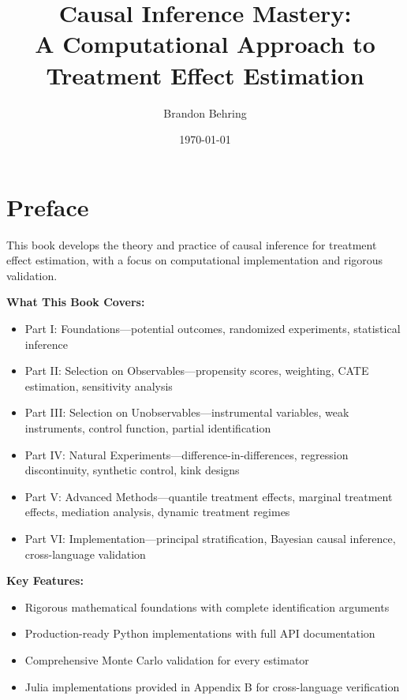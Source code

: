 \documentclass[11pt,oneside]{amsbook}
\title{Causal Inference Mastery:\\
A Computational Approach to Treatment Effect Estimation}
\author{Brandon Behring}
\date{\today}
\theoremstyle{definition}
\theoremstyle{plain}
\theoremstyle{remark}
\begin{document}

\frontmatter

\maketitle

\tableofcontents

\chapter{Preface}

This book develops the theory and practice of causal inference for treatment effect estimation, with a focus on computational implementation and rigorous validation.

\textbf{What This Book Covers:}
\begin{itemize}
    \item Part I: Foundations---potential outcomes, randomized experiments, statistical inference
    \item Part II: Selection on Observables---propensity scores, weighting, CATE estimation, sensitivity analysis
    \item Part III: Selection on Unobservables---instrumental variables, weak instruments, control function, partial identification
    \item Part IV: Natural Experiments---difference-in-differences, regression discontinuity, synthetic control, kink designs
    \item Part V: Advanced Methods---quantile treatment effects, marginal treatment effects, mediation analysis, dynamic treatment regimes
    \item Part VI: Implementation---principal stratification, Bayesian causal inference, cross-language validation
\end{itemize}

\textbf{Key Features:}
\begin{itemize}
    \item Rigorous mathematical foundations with complete identification arguments
    \item Production-ready Python implementations with full API documentation
    \item Comprehensive Monte Carlo validation for every estimator
    \item Julia implementations provided in Appendix B for cross-language verification
\end{itemize}
\end{document}
